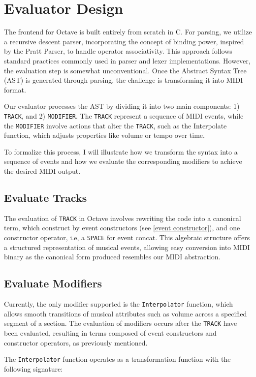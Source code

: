 \documentclass[letterpaper,12pt]{article}
\begin{document}
\section{Evaluator Design}
The frontend for Octave is built entirely from scratch in C. For parsing, we utilize a recursive descent parser, incorporating the concept of binding power, inspired by the Pratt Parser, to handle operator associativity. This approach follows standard practices commonly used in parser and lexer implementations. However, the evaluation step is somewhat unconventional. Once the Abstract Syntax Tree (AST) is generated through parsing, the challenge is transforming it into MIDI format.

Our evaluator processes the AST by dividing it into two main components: 1) \texttt{TRACK}, and 2) \texttt{MODIFIER}. The \texttt{TRACK} represent a sequence of MIDI events, while the \texttt{MODIFIER} involve actions that alter the \texttt{TRACK}, such as the Interpolate function, which adjusts properties like volume or tempo over time.

To formalize this process, I will illustrate how we transform the syntax into a sequence of events and how we evaluate the corresponding modifiers to achieve the desired MIDI output.

\subsection{Evaluate Tracks}
The evaluation of \texttt{TRACK}  in Octave involves rewriting the code into a canonical term,
 which construct by event constructors (see \ref{event constructor}), and one constructor operator, i.e, a \texttt{SPACE} 
for event concat. This algebraic structure offers a structured 
representation of musical events, allowing easy conversion into MIDI binary as the canonical form produced 
resembles our MIDI abstraction.

\subsection{Evaluate Modifiers}
Currently, the only modifier supported is the \texttt{Interpolator} function, which allows smooth transitions of musical attributes such as volume across a specified segment of a section. The evaluation of modifiers occurs after the \texttt{TRACK} have been 
evaluated, resulting in terms composed of event constructors and constructor operators, as 
previously mentioned.

The \texttt{Interpolator} function operates as a transformation function with the following signature:
\end{document}
